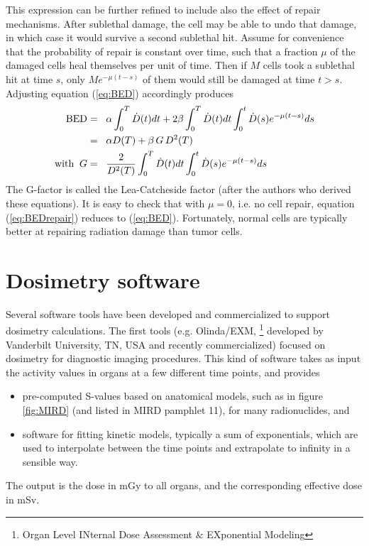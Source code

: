 This expression can be further refined to include also the effect of
repair mechanisms. After sublethal damage, the cell may be able to
undo that damage, in which case it would survive a second sublethal
hit. Assume for convenience that the probability of repair is constant
over time, such that a fraction $\mu$ of the damaged cells heal
themselves per unit of time. Then if $M$ cells took a sublethal hit at
time $s$, only $M e^{-\mu (t - s)}$ of them would still be damaged at
time $t > s$. Adjusting equation (\ref{eq:BED}) accordingly produces
\begin{align}
  \mbox{BED} &=\;\; \alpha \int_0^T \dot D(t) dt
  + 2 \beta \int_0^T \dot D(t) dt
  \int_0^t \dot D(s) e^{-\mu(t-s)}ds \nonumber\\
  &=\;\; \alpha D(T) + \beta \, G \, D^2(T) \label{eq:BEDrepair}\\
  \mbox{with\;\;} G &=\;\; \frac{2}{D^2(T)} \int_0^T \dot D(t) dt
    \int_0^t \dot D(s) e^{-\mu(t-s)}ds \nonumber
\end{align}
The G-factor is called the Lea-Catcheside factor (after the authors
who derived these equations). It is easy to check that with $\mu =
0$, i.e. no cell repair, equation (\ref{eq:BEDrepair}) reduces to
(\ref{eq:BED}). Fortunately, normal cells are typically better at
repairing radiation damage than tumor cells.

\section{Dosimetry software}
Several software tools have been developed and commercialized to
support dosimetry calculations. The first tools (e.g. Olinda/EXM,
\footnote{Organ Level INternal Dose Assessment \& EXponential
  Modeling} developed by Vanderbilt University, TN, USA and recently
commercialized) focused on dosimetry for diagnostic imaging
procedures. This kind of software takes as input the activity values
in organs at a few different time points, and provides
\begin{itemize}
  \item pre-computed S-values based on anatomical models, such as in
    figure \ref{fig:MIRD} (and listed in MIRD pamphlet 11), for many
    radionuclides, and
  \item software for fitting kinetic models, typically a sum of
    exponentials, which are used to interpolate between the time
    points and extrapolate to infinity in a sensible way.
\end{itemize}
The output is the dose in mGy to all organs, and the corresponding
effective dose in mSv.

